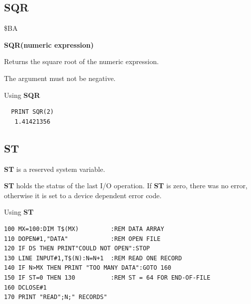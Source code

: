 \subsection{SQR}
\begin{description}[leftmargin=2cm,style=nextline]
\item [Token:] \$BA
\item [Format:] {\bf SQR(numeric expression)}
\item [Usage:] Returns the square root of the numeric expression.

\item [Remarks:] The argument must not be negative.
\item [Example:] Using {\bf SQR}
\begin{tcolorbox}[colback=black,coltext=white]
\verbatimfont{\codefont}
\begin{verbatim}
  PRINT SQR(2)
   1.41421356
\end{verbatim}
\end{tcolorbox}
\end{description}


\newpage
\subsection{ST}
\begin{description}[leftmargin=2cm,style=nextline]
\item [Format:] {\bf ST} is a reserved system variable.
\item [Usage:]  {\bf ST} holds the status of the last I/O operation.
                If {\bf ST} is zero, there was no error, otherwise
                it is set to a device dependent error code.

\item [Example:] Using {\bf ST}
\begin{tcolorbox}[colback=black,coltext=white]
\verbatimfont{\codefont}
\begin{verbatim}
100 MX=100:DIM T$(MX)         :REM DATA ARRAY
110 DOPEN#1,"DATA"            :REM OPEN FILE
120 IF DS THEN PRINT"COULD NOT OPEN":STOP
130 LINE INPUT#1,T$(N):N=N+1  :REM READ ONE RECORD
140 IF N>MX THEN PRINT "TOO MANY DATA":GOTO 160
150 IF ST=0 THEN 130          :REM ST = 64 FOR END-OF-FILE
160 DCLOSE#1
170 PRINT "READ";N;" RECORDS"
\end{verbatim}
\end{tcolorbox}
\end{description}

